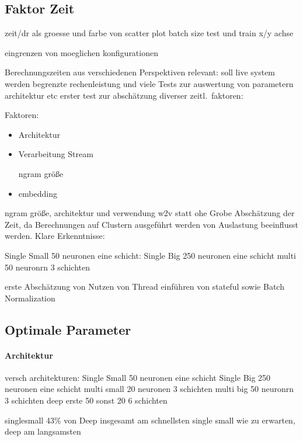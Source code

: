    \subsection{Faktor Zeit}

        zeit/dr als groesse und farbe von scatter plot
        batch size test und train x/y achse

        eingrenzen von moeglichen konfigurationen

        Berechnungszeiten aus verschiedenen Perspektiven relevant:
        soll live system werden
        begrenzte rechenleistung und viele Tests zur auswertung von parametern architektur etc
        erster test zur abschätzung diverser zeitl.\ faktoren:

        Faktoren:
        \begin{itemize}
            \item Architektur
            \item Verarbeitung Stream

                 ngram größe
            \item embedding
        \end{itemize}

        ngram größe, architektur und verwendung w2v statt ohe
        Grobe Abschätzung der Zeit, da Berechnungen auf Clustern ausgeführt werden von Auslastung beeinflusst werden.
        Klare Erkenntnisse:

            Single Small 50 neuronen eine schicht:
            Single Big 250 neuronen eine schicht
            multi 50 neuronrn 3 schichten

        erste Abschätzung von Nutzen von Thread 
        einführen von stateful sowie Batch Normalization

    \subsection{Optimale Parameter}

        \paragraph{Architektur}
            versch architekturen:
            Single Small 50 neuronen eine schicht
            Single Big 250 neuronen eine schicht
            multi small 20 neuronen 3 schichten
            multi big 50 neuronrn 3 schichten
            deep erste 50 sonst 20 6 schichten

            singlesmall 43\% von Deep
            insgesamt am schnellsten single small
            wie zu erwarten,  deep am langsamsten

